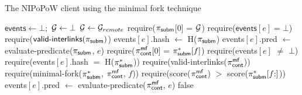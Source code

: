 \begin{algorithm}
    \caption{\label{alg:minimal-fork}The \textsf{NIPoPoW} client using the minimal fork technique}

    \begin{algorithmic}[1]

    \State $\textsf{events} \gets \bot;$ $\mathcal{G} \gets \bot$
        \State $\mathcal{G} \gets \mathcal{G}_{remote}$
    \EndFunction
        \State \textsf{require}($\mathsf{\pi_{subm}}$[0] = $\mathcal{G}$)
        \State \textsf{require}($\textsf{events$[e]$} = \bot$)
        \State \textsf{require}($\textsf{valid-interlinks}(\mathsf{\pi_{subm}})$)
        \State \textsf{events$[e]$.hash} $\gets$ \textsf{H}($\mathsf{\pi_{subm}}$)
        \State \textsf{events$[e]$.pred} $\gets$
        \textsf{evaluate-predicate}(\textsf{$\mathsf{\pi_{subm}}$}, $e$)
    \EndFunction
        \State \textsf{require}($\mathsf{\pi_{cont}^{mf}}$[0] = $\mathsf{\pi_{subm}^*}[f]$)
        \State \textsf{require}(\textsf{events}$[e]$ $\ne$ $\bot$)
        \State \textsf{require}(\textsf{events$[e]$.hash} $=$ \textsf{H}($\mathsf{\pi_{subm}^*}$))
        \State \textsf{require}(\textsf{valid-interlinks}($\mathsf{\pi_{cont}^{mf}}$))
        \State \textsf{require}(\textsf{minimal-fork}($\mathsf{\pi_{subm}^*}$,
        $\mathsf{\pi_{cont}^{mf}}$, $f$))
        \State \textsf{require}(\textsf{score}($\mathsf{\pi_{cont}^{mf}}$)
        $>$ \textsf{score}($\mathsf{\pi_{subm}^*}[f{:}]$))
        \State \textsf{events$[e]$.pred} $\gets$
            \textsf{evaluate-predicate}($\mathsf{\pi_{cont}^{mf}}$, $e$)
    \EndFunction
                \State\Return false
            \EndIf
        \EndFor
    \EndFunction
    \EndContract
    \vskip8pt
    \end{algorithmic}
\end{algorithm}

